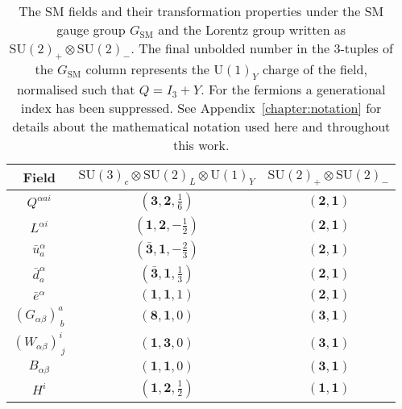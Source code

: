 \begin{table}[t]
  \centering
  \bgroup
  \def\arraystretch{1.3}%
  \begin{tabular}{ccc}
    \toprule
    Field                        & $\mathrm{SU}(3)_{c} \otimes \mathrm{SU}(2)_{L} \otimes \mathrm{U}(1)_{Y}$ & $\mathrm{SU}(2)_{+} \otimes \mathrm{SU}(2)_{-}$ \\
    \midrule
    $Q^{\alpha a i}$             & $(\mathbf{3}, \mathbf{2}, \tfrac{1}{6})$                                  & $(\mathbf{2}, \mathbf{1})$                      \\
    $L^{\alpha i}$               & $(\mathbf{1}, \mathbf{2}, -\tfrac{1}{2})$                                 & $(\mathbf{2}, \mathbf{1})$                      \\
    $\bar{u}^{\alpha}_a$                  & $(\bar{\mathbf{3}}, \mathbf{1}, -\tfrac{2}{3})$                           & $(\mathbf{2}, \mathbf{1})$                      \\
    $\bar{d}^{\alpha}_a$                  & $(\bar{\mathbf{3}}, \mathbf{1}, \tfrac{1}{3})$                            & $(\mathbf{2}, \mathbf{1})$                      \\
    $\bar{e}^{\alpha}$                    & $(\mathbf{1}, \mathbf{1}, 1)$                                             & $(\mathbf{2}, \mathbf{1})$                      \\
    $(G_{\alpha \beta})^a_{\ b}$ & $(\mathbf{8}, \mathbf{1}, 0)$                                             & $(\mathbf{3}, \mathbf{1})$                      \\
    $(W_{\alpha \beta})^i_{\ j}$ & $(\mathbf{1}, \mathbf{3}, 0)$                                             & $(\mathbf{3}, \mathbf{1})$                      \\
    $B_{\alpha \beta}$           & $(\mathbf{1}, \mathbf{1}, 0)$                                             & $(\mathbf{3}, \mathbf{1})$                      \\
    $H^{i}$                      & $(\mathbf{1}, \mathbf{2}, \tfrac{1}{2})$                                  & $(\mathbf{1}, \mathbf{1})$                      \\
    \bottomrule
  \end{tabular}
  \egroup
  \caption[The SM fields and their transformation properties under the SM gauge
  group $G_{\text{SM}}$ and the Lorentz group written as
  $\mathrm{SU}(2)_{+} \otimes \mathrm{SU}(2)_{-}$.]{The SM fields and their
    transformation properties under the SM gauge group $G_{\text{SM}}$ and the
    Lorentz group written as $\mathrm{SU}(2)_{+} \otimes \mathrm{SU}(2)_{-}$.
    The final unbolded number in the 3-tuples of the $G_{\text{SM}}$ column
    represents the $\mathrm{U}(1)_Y$ charge of the field, normalised such that
    $Q = I_{3} + Y$. For the fermions a generational index has been suppressed.
    See Appendix~\ref{chapter:notation} for details about the mathematical
    notation used here and throughout this work.}
  \label{tab:ch1-sm-fields}
\end{table}


